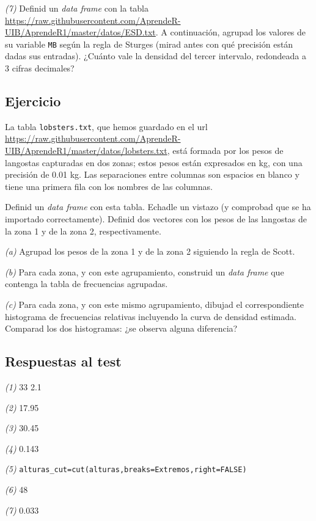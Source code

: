 \documentclass[]{book}
\theoremstyle{definition}
\theoremstyle{definition}
\theoremstyle{definition}
\theoremstyle{remark}
\begin{document}
\emph{(7)} Definid un \emph{data frame} con la tabla \url{https://raw.githubusercontent.com/AprendeR-UIB/AprendeR1/master/datos/ESD.txt}. A continuación, agrupad los valores de su variable \texttt{MB} según la regla de Sturges (mirad antes con qué precisión están dadas sus entradas). ¿Cuánto vale la densidad del tercer intervalo, redondeada a 3 cifras decimales?

\hypertarget{ejercicio-10}{%
\subsection*{Ejercicio}\label{ejercicio-10}}

La tabla \texttt{lobsters.txt}, que hemos guardado en el url \url{https://raw.githubusercontent.com/AprendeR-UIB/AprendeR1/master/datos/lobsters.txt}, está formada por los pesos de langostas capturadas en dos zonas; estos pesos están expresados en kg, con una precisión de 0.01 kg. Las separaciones entre columnas son espacios en blanco y tiene una primera fila con los nombres de las columnas.

Definid un \emph{data frame} con esta tabla. Echadle un vistazo (y comprobad que se ha importado correctamente). Definid dos vectores con los pesos de las langostas de la zona 1 y de la zona 2, respectivamente.

\emph{(a)} Agrupad los pesos de la zona 1 y de la zona 2 siguiendo la regla de Scott.

\emph{(b)} Para cada zona, y con este agrupamiento, construid un \emph{data frame} que contenga la tabla de frecuencias agrupadas.

\emph{(c)} Para cada zona, y con este mismo agrupamiento, dibujad el correspondiente histograma de frecuencias relativas incluyendo la curva de densidad estimada. Comparad los dos histogramas: ¿se observa alguna diferencia?

\hypertarget{respuestas-al-test-10}{%
\subsection*{Respuestas al test}\label{respuestas-al-test-10}}

\emph{(1)} 33 2.1

\emph{(2)} 17.95

\emph{(3)} 30.45

\emph{(4)} 0.143

\emph{(5)} \texttt{alturas\_cut=cut(alturas,breaks=Extremos,right=FALSE)}

\emph{(6)} 48

\emph{(7)} 0.033
\end{document}
